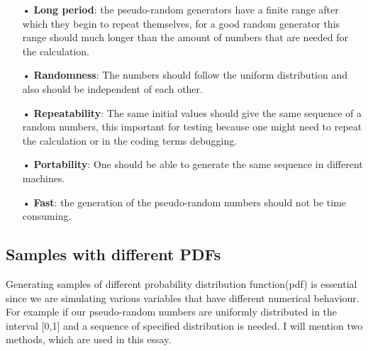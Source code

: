 \begin{itemize}
\item[•]\textbf{Long period}: the pseudo-random generators have a finite range after which they begin to repeat themselves, for a good random generator this range should much longer than the amount of numbers that are needed for the calculation. 

\item[•]\textbf{Randomness}: The numbers should follow the uniform distribution and also should be independent of each other.

\item[•]\textbf{Repeatability}: The same initial values should give the same sequence of a random numbers, this important for testing because one might need to repeat the calculation or in the coding terms debugging.

\item[•]\textbf{Portability}: One should be able to generate the same sequence in different machines. 

\item[•]\textbf{Fast}: the generation of the pseudo-random numbers should not be time consuming\citep{Weinzierl}.    
\end{itemize}



\subsection{Samples with different PDFs}
Generating samples of different probability distribution function(pdf) is essential since we are simulating various variables that have different numerical behaviour. For example if our pseudo-random numbers are uniformly distributed in the interval [0,1] and a sequence of specified distribution is needed. I will mention two methods, which are used in this essay.

